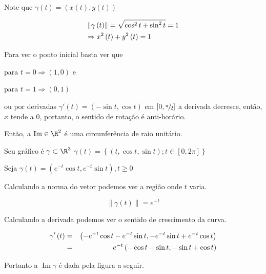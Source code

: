 \documentclass[11pt, oneside, a4paper]{gsm-l}
\begin{document}
\begin{sol}
    Note que $\gamma \left( t \right) = \left( {x\left( t \right),y\left( t \right)} \right)$

\[
\begin{gathered}
      \left\| {\gamma \left( t \right)} \right\| = \sqrt {\cos ^2 t + \sin ^2 t}  = 1 \hfill \\
\Rightarrow x^2 \left( t \right) + y^2 \left( t \right) = 1 \hfill \\
\end{gathered}
\]


Para ver o ponto inicial basta ver que

para $t=0 \Rightarrow \left( {1,0} \right)$ e

para $t=1 \Rightarrow \left( {0,1} \right)$

    ou por derivadas $\gamma '\left( t \right) = \left( { - \sin t,\cos t} \right)$ em $\left[ {0,{\raise0.5ex\hbox{$\scriptstyle \pi $}
\kern-0.1em/\kern-0.15em
    \lower0.25ex\hbox{$\scriptstyle 2$}}} \right]$ a derivada decresce, então, $x$ tende a $0$, portanto, o sentido de rotação é anti-horário.

    Então, a $\operatorname{Im}  \in \R^2$ é uma circunfer\^encia de raio unitário.

    Seu gráfico é $\gamma  \subset \R^3$ $\gamma \left( t \right)= \left\{ {\left( {t,\cos t,\sin t} \right);t \in \left[ {0,2\pi } \right]} \right\}$

\end{sol}

\begin{exem}
    Seja $\gamma \left( t \right) = \left( {e^{ - t} \cos t,e^{ - t} \sin t} \right),t \geqslant 0$
\end{exem}

\begin{sol}
Calculando a norma do vetor podemos ver a região onde $t$ varia.

\[
\left\| {\gamma \left( t \right)} \right\| = e^{ - t}
\]

Calculando a derivada podemos ver o sentido de crescimento da curva.

\begin{eqnarray*}
      \gamma '\left( t \right) &=& \left( { - e^{ - t} \cos t - e^{ - t} \sin t, - e^{ - t} \sin t + e^{ - t} \cos t} \right) \hfill \\
       &=& e^{ - t} \left( { - \cos t - \sin t, - \sin t + \cos t} \right) \hfill \\
\end{eqnarray*}

Portanto a $\operatorname{Im} \gamma$ é dada pela figura a seguir.



\end{sol}
\end{document}
